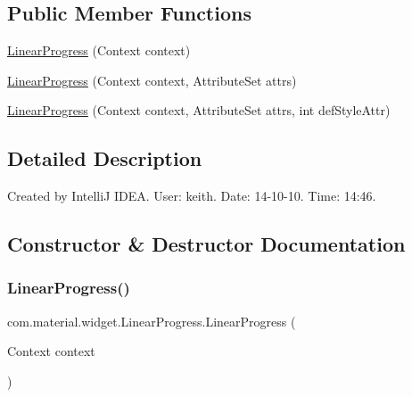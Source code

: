 \subsection*{Public Member Functions}
\begin{DoxyCompactItemize}
\item 
\hyperlink{classcom_1_1material_1_1widget_1_1_linear_progress_ac1859d39d1050d2dd172555fb0e9cf04}{Linear\+Progress} (Context context)
\item 
\hyperlink{classcom_1_1material_1_1widget_1_1_linear_progress_a768fa049552daed30aa829fb62f60099}{Linear\+Progress} (Context context, Attribute\+Set attrs)
\item 
\hyperlink{classcom_1_1material_1_1widget_1_1_linear_progress_a8f6e73d2d4c8aab93c431d67d290ba50}{Linear\+Progress} (Context context, Attribute\+Set attrs, int def\+Style\+Attr)
\end{DoxyCompactItemize}


\subsection{Detailed Description}
Created by IntelliJ I\+D\+EA. User\+: keith. Date\+: 14-\/10-\/10. Time\+: 14\+:46. 

\subsection{Constructor \& Destructor Documentation}
\mbox{\label{classcom_1_1material_1_1widget_1_1_linear_progress_ac1859d39d1050d2dd172555fb0e9cf04}} 
\subsubsection{\texorpdfstring{Linear\+Progress()}{LinearProgress()}\hspace{0.1cm}{\footnotesize\ttfamily [1/3]}}
{\footnotesize\ttfamily com.\+material.\+widget.\+Linear\+Progress.\+Linear\+Progress (\begin{DoxyParamCaption}\item[{Context}]{context }\end{DoxyParamCaption})}

